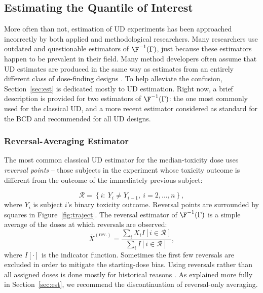 \subsection{Estimating the Quantile of Interest}

More often than not, estimation of UD experiments has been approached incorrectly by both applied and methodological researchers. Many researchers use outdated and questionable estimators of $\F^{-1}(\Gamma)$, just because these estimators happen to be prevalent in their field. Many method developers often assume that UD estimates are produced in the same way as estimates from an entirely different class of dose-finding designs \citep{Zack:stag:2009}. To help alleviate the confusion, Section~\ref{sec:est} is dedicated mostly to UD estimation. Right now, a brief description is provided for two  estimators of $\F^{-1}(\Gamma)$: the one most commonly used for the classical UD, and a more recent estimator considered as standard for the BCD and recommended for all UD designs.

\subsubsection{Reversal-Averaging Estimator}

The most common classical UD estimator for the median-toxicity dose uses \emph{reversal points} -- those subjects in the experiment whose toxicity outcome is different from the outcome of the immediately previous subject:

\begin{equation}\label{eq:reversal}
\mathcal{R}=\left\{i:\ Y_i\neq Y_{i-1},\ i=2,\ldots ,n\right\},
\end{equation}
where $Y_i$ is subject $i$'s binary toxicity outcome. Reversal points are surrounded by squares in Figure~\ref{fig:traject}. The reversal estimator of $\F^{-1}(\Gamma)$ is a simple average of the doses at which reversals are observed:
\begin{equation}\label{eq:reversav}
\overline{X}^{\mathrm{(rev.)}}=\frac{\sum_iX_iI\left[i\in\mathcal{R}\right]}{\sum_iI\left[i\in\mathcal{R}\right]},
\end{equation}
\noindent where $I[\cdot]$ is the indicator function. Sometimes the first few reversals are excluded in order to mitigate the starting-dose bias. Using reversals rather than all assigned doses is done mostly for historical reasons \citep{Weth:Chen:Vasu:est:1966}. As explained more fully in Section~\ref{sec:est}, we recommend the discontinuation of reversal-only averaging.

